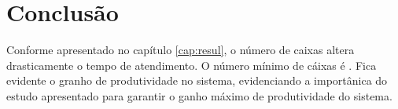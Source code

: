 \chapter{Conclusão}
Conforme apresentado no capítulo \ref{cap:resul}, o número
de caixas altera drasticamente o tempo de atendimento.
O número mínimo de cáixas é .%
Fica evidente o granho de produtividade no sistema,
evidenciando a importânica do estudo apresentado para
garantir o ganho máximo de produtividade do sistema.

